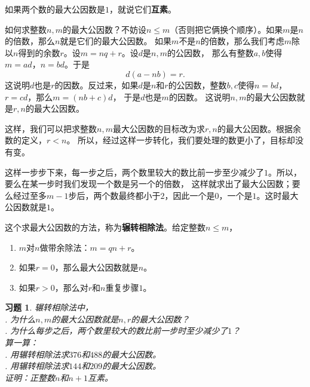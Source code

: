 \documentclass[12pt,UTF8]{ctexbook}
\newtheorem{xt}{习题}[section]
\begin{document}
如果两个数的最大公因数是$1$，就说它们\textbf{互素}。

如何求整数$n,m$的最大公因数？不妨设$n\leqslant m$（否则把它俩换个顺序）。如果$m$是$n$的倍数，那么$n$就是它们的最大公因数。
如果$m$不是$n$的倍数，那么我们考虑$m$除以$n$得到的余数$r$。设$m = nq + r$。设$d$是$n,m$的公因数，
那么有整数$a,b$使得$m = ad$，$n = bd$。于是
$$ d(a - nb) = r.$$
这说明$d$也是$r$的因数。反过来，如果$d$是$n$和$r$的公因数，整数$b, c$使得$n = bd$，$r = cd$，那么$m = (nb + c)d$，
于是$d$也是$m$的因数。
这说明$n,m$的最大公因数就是$r,n$的最大公因数。

这样，我们可以把求整数$n,m$最大公因数的目标改为求$r,n$的最大公因数。根据余数的定义，$r < n$。
所以，经过这样一步转化，我们要处理的数更小了，目标却没有变。

这样一步步下来，每一步之后，两个数里较大的数比前一步至少减少了$1$。所以，要么在某一步时我们发现一个数是另一个的倍数，
这样就求出了最大公因数；要么经过至多$m-1$步后，两个数最终都小于$2$，因此一个是$0$，一个是$1$。这时最大公因数就是$1$。

这个求最大公因数的方法，称为\textbf{辗转相除法}。给定整数$n\leqslant m$，
\begin{enumerate}
    \item $m$对$n$做带余除法：$m = q n + r$。
    \item 如果$r = 0$，那么最大公因数就是$n$。
    \item 如果$r > 0$，那么对$r$和$n$重复步骤$1$。
\end{enumerate}

\begin{xt}\label{xt:5-1-0}
    辗转相除法中，\\
    . 为什么$n,m$的最大公因数就是$n,r$的最大公因数？\\
    . 为什么每步之后，两个数里较大的数比前一步时至少减少了$1$？\\
    算一算：\\
    . 用辗转相除法求$376$和$488$的最大公因数。\\
    . 用辗转相除法求$144$和$209$的最大公因数。\\
    证明：正整数$n$和$n+1$互素。
\end{xt}
\end{document}

